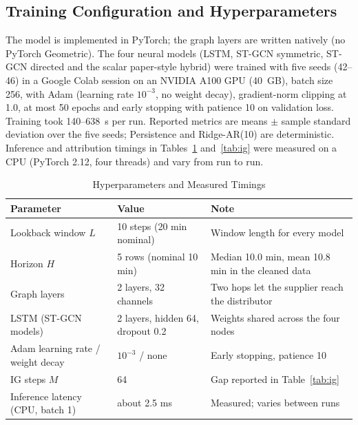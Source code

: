 \documentclass[conference]{IEEEtran}
\begin{document}
\subsection{Training Configuration and Hyperparameters}
The model is implemented in PyTorch; the graph layers are written natively (no PyTorch Geometric). The four neural models (LSTM, ST-GCN symmetric, ST-GCN directed and the scalar paper-style hybrid) were trained with five seeds (42--46) in a Google Colab session on an NVIDIA A100 GPU (40~GB), batch size 256, with Adam \cite{r20} (learning rate $10^{-3}$, no weight decay), gradient-norm clipping at 1.0, at most 50 epochs and early stopping with patience 10 on validation loss. Training took 140--638~s per run. Reported metrics are means $\pm$ sample standard deviation over the five seeds; Persistence and Ridge-AR(10) are deterministic. Inference and attribution timings in Tables~\ref{tab:hyper} and~\ref{tab:ig} were measured on a CPU (PyTorch 2.12, four threads) and vary from run to run.

\begin{table}[t]
\caption{Hyperparameters and Measured Timings}
\label{tab:hyper}
\centering
\footnotesize
\begin{tabular}{@{}p{2.4cm}p{2.5cm}p{2.5cm}@{}}
\toprule
Parameter & Value & Note \\
\midrule
Lookback window $L$ & 10 steps (20 min nominal) & Window length for every model \\
Horizon $H$ & 5 rows (nominal 10 min) & Median 10.0 min, mean 10.8 min in the cleaned data \\
Graph layers & 2 layers, 32 channels & Two hops let the supplier reach the distributor \\
LSTM (ST-GCN models) & 2 layers, hidden 64, dropout 0.2 & Weights shared across the four nodes \\
Adam learning rate / weight decay & $10^{-3}$ / none & Early stopping, patience 10 \\
IG steps $M$ & 64 & Gap reported in Table~\ref{tab:ig} \\
Inference latency (CPU, batch 1) & about 2.5 ms & Measured; varies between runs \\
\bottomrule
\end{tabular}
\end{table}
\end{document}
